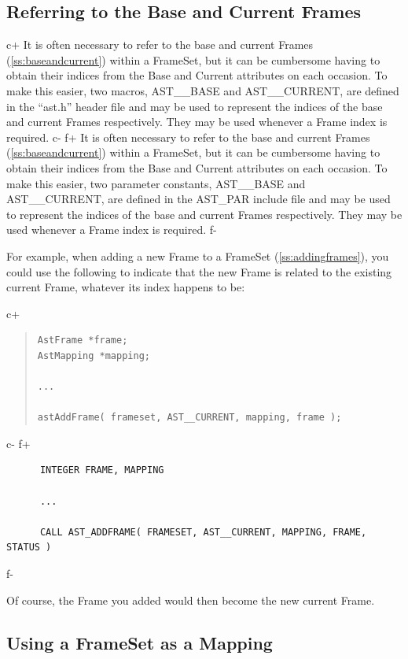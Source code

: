\documentclass[twoside,11pt]{article}
\newcommand{\secref}[1]{\S\ref{#1}}
\renewcommand{\secref}[1]{\ref{#1}}
\begin{document}
\subsection{\label{ss:astbaseandastcurrent}Referring to the Base and Current Frames}

c+
It is often necessary to refer to the base and current Frames
(\secref{ss:baseandcurrent}) within a FrameSet, but it can be
cumbersome having to obtain their indices from the Base and Current
attributes on each occasion. To make this easier, two macros,
AST\_\_BASE and AST\_\_CURRENT, are defined in the ``ast.h'' header
file and may be used to represent the indices of the base and current
Frames respectively. They may be used whenever a Frame index is
required.
c-
f+
It is often necessary to refer to the base and current Frames
(\secref{ss:baseandcurrent}) within a FrameSet, but it can be
cumbersome having to obtain their indices from the Base and Current
attributes on each occasion. To make this easier, two parameter
constants, AST\_\_BASE and AST\_\_CURRENT, are defined in the AST\_PAR
include file and may be used to represent the indices of the base and
current Frames respectively. They may be used whenever a Frame index
is required.
f-

For example, when adding a new Frame to a FrameSet
(\secref{ss:addingframes}), you could use the following to indicate
that the new Frame is related to the existing current Frame, whatever
its index happens to be:

c+
\begin{quote}
\small
\begin{verbatim}
AstFrame *frame;
AstMapping *mapping;

...

astAddFrame( frameset, AST__CURRENT, mapping, frame );
\end{verbatim}
\normalsize
\end{quote}
c-
f+
\small
\begin{verbatim}
      INTEGER FRAME, MAPPING

      ...

      CALL AST_ADDFRAME( FRAMESET, AST__CURRENT, MAPPING, FRAME, STATUS )
\end{verbatim}
\normalsize
f-

Of course, the Frame you added would then become the new current
Frame.

\subsection{\label{ss:framesetasmapping}Using a FrameSet as a Mapping}
\end{document}

